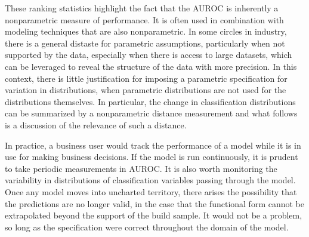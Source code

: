 These ranking statistics highlight the fact that the AUROC is inherently a nonparametric measure of performance.
It is often used in combination with modeling techniques that are also nonparametric.
%
In some circles in industry, there is a general distaste for parametric assumptions, particularly when not supported by the data, especially when there is access to large datasets, which can be leveraged to reveal the structure of the data with more precision.
%
In this context, there is little justification for imposing a parametric specification for variation in distributions, when parametric distributions are not used for the distributions themselves.
%
In particular, the change in classification distributions can be summarized by a nonparametric distance measurement and what follows is a discussion of the relevance of such a distance.





In practice, a business user would track the performance of a model while it is in use for making business decisions.
If the model is run continuously, it is prudent to take periodic measurements in AUROC.
It is also worth monitoring the variability in distributions of classification variables passing through the model.
Once any model moves into uncharted territory, there arises the possibility that the predictions are no longer valid, in the case that the functional form cannot be extrapolated beyond the support of the build sample.
It would not be a problem, so long as the specification were correct throughout the domain of the model.

